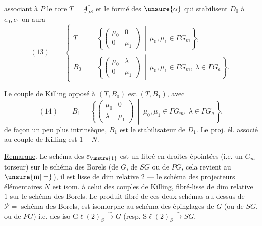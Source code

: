 associant à  $P$ le  tore
$T=\underline{A}_P^*$, et le
formé des $\unsure{\alpha}$ qui stabilisent
 $D_0$
à $e_0,e_1$ on aura
\[
(13)\qquad
\left\{
\begin{aligned}
T&=\left\{\begin{pmatrix}\mu_0&0\\0&\mu_1\end{pmatrix}
\ \middle|\ \mu_0,\mu_1\in\Gamma G_m\right\},\\
B_0&=\left\{\begin{pmatrix}\mu_0&\lambda\\0&\mu_1\end{pmatrix}
\ \middle|\ \mu_0,\mu_1\in\Gamma G_m,\ \lambda\in\Gamma G_a\right\}.
\end{aligned}
\right.
\]

Le couple de Killing \uline{opposé} à $(T,B_0)$ est
$(T,B_1)$, avec
\[
(14)\qquad
B_1=\left\{\begin{pmatrix}\mu_0&0\\\lambda&\mu_1\end{pmatrix}
\ \middle|\ \mu_0,\mu_1\in\Gamma G_m,\ \lambda\in\Gamma G_a\right\},
\]
de façon un peu plus intrinsèque, $B_1$
 est le stabilisateur de $D_1$.
Le proj. él. associé au couple de Killing
 est $1-N$.

\uline{Remarque}. Le schéma des $\varepsilon_{\unsure{1}}$
est un fibré en droites épointées (i.e. un $G_m$-torseur)
sur le schéma  des Borels
(de $G$, de $SG$ ou de $PG$, cela revient au $\unsure{\overline{\mathrm m}|=}$),
il est  lisse de dim relative $2$ — le schéma des
projecteurs élémentaires $N$ est  isom.
à celui des couples de Killing, fibré-lisse de dim relative $1$
sur le schéma des Borels. Le  produit fibré de
ces deux schémas  au dessus de
$\mathcal P=$ schéma des Borels, est isomorphe au schéma
des épinglages de $G$ (ou de $SG$, ou de $PG$)
i.e. des iso $\mathrm{G}\ell(2)_S\xrightarrow{\sim}G$
(resp. $\mathrm{S}\ell(2)_S\xrightarrow{\sim}SG$,

